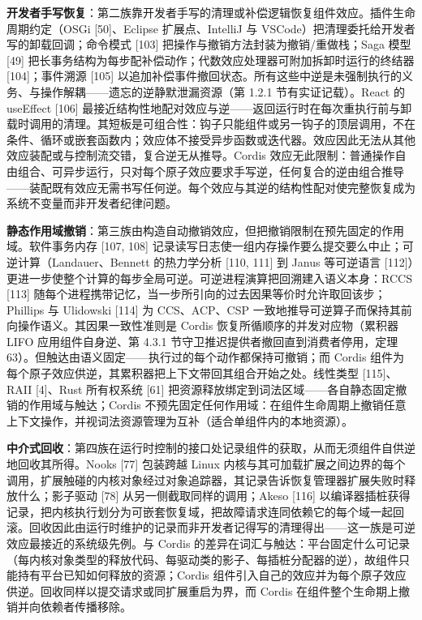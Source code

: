 \documentclass[11pt,a4paper]{article}
\theoremstyle{plain}
\theoremstyle{definition}
\theoremstyle{remark}
\begin{document}
\textbf{开发者手写恢复}：第二族靠开发者手写的清理或补偿逻辑恢复组件效应。插件生命周期约定（OSGi [50]、Eclipse 扩展点、IntelliJ 与 VSCode）把清理委托给开发者写的卸载回调；命令模式 [103] 把操作与撤销方法封装为撤销/重做栈；Saga 模型 [49] 把长事务结构为每步配补偿动作；代数效应处理器可附加拆卸时运行的终结器 [104]；事件溯源 [105] 以追加补偿事件撤回状态。所有这些中逆是未强制执行的义务、与操作解耦——遗忘的逆静默泄漏资源（第 1.2.1 节有实证记载）。React 的 useEffect [106] 最接近结构性地配对效应与逆——返回运行时在每次重执行前与卸载时调用的清理。其短板是可组合性：钩子只能组件或另一钩子的顶层调用，不在条件、循环或嵌套函数内；效应体不接受异步函数或迭代器。效应因此无法从其他效应装配或与控制流交错，复合逆无从推导。Cordis 效应无此限制：普通操作自由组合、可异步运行，只对每个原子效应要求手写逆，任何复合的逆由组合推导——装配既有效应无需书写任何逆。每个效应与其逆的结构性配对使完整恢复成为系统不变量而非开发者纪律问题。

\textbf{静态作用域撤销}：第三族由构造自动撤销效应，但把撤销限制在预先固定的作用域。软件事务内存 [107, 108] 记录读写日志使一组内存操作要么提交要么中止；可逆计算（Landauer、Bennett 的热力学分析 [110, 111] 到 Janus 等可逆语言 [112]）更进一步使整个计算的每步全局可逆。可逆进程演算把回溯建入语义本身：RCCS [113] 随每个进程携带记忆，当一步所引向的过去因果等价时允许取回该步；Phillips 与 Ulidowski [114] 为 CCS、ACP、CSP 一致地推导可逆算子而保持其前向操作语义。其因果一致性准则是 Cordis 恢复所循顺序的并发对应物（累积器 LIFO 应用组件自身逆、第 4.3.1 节守卫推迟提供者撤回直到消费者停用，定理 63）。但触达由语义固定——执行过的每个动作都保持可撤销；而 Cordis 组件为每个原子效应供逆，其累积器把上下文带回其组合开始之处。线性类型 [115]、RAII [4]、Rust 所有权系统 [61] 把资源释放绑定到词法区域——各自静态固定撤销的作用域与触达；Cordis 不预先固定任何作用域：在组件生命周期上撤销任意上下文操作，并视词法资源管理为互补（适合单组件内的本地资源）。

\textbf{中介式回收}：第四族在运行时控制的接口处记录组件的获取，从而无须组件自供逆地回收其所得。Nooks [77] 包装跨越 Linux 内核与其可加载扩展之间边界的每个调用，扩展触碰的内核对象经过对象追踪器，其记录告诉恢复管理器扩展失败时释放什么；影子驱动 [78] 从另一侧截取同样的调用；Akeso [116] 以编译器插桩获得记录，把内核执行划分为可嵌套恢复域，把故障请求连同依赖它的每个域一起回滚。回收因此由运行时维护的记录而非开发者记得写的清理得出——这一族是可逆效应最接近的系统级先例。与 Cordis 的差异在词汇与触达：平台固定什么可记录（每内核对象类型的释放代码、每驱动类的影子、每插桩分配器的逆），故组件只能持有平台已知如何释放的资源；Cordis 组件引入自己的效应并为每个原子效应供逆。回收同样以提交请求或同扩展重启为界，而 Cordis 在组件整个生命期上撤销并向依赖者传播移除。
\end{document}
